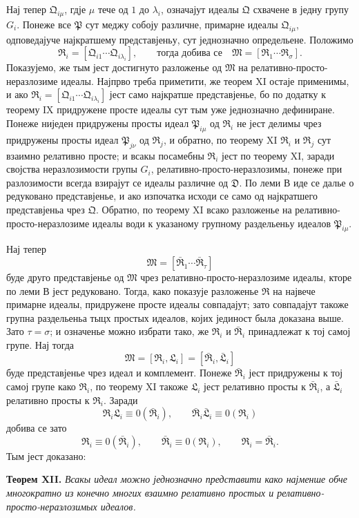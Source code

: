 ﻿\documentclass[11pt]{article}
\newcommand{\ideal}[1]{\mathfrak{#1}}
\begin{document}
Нај тепер \(\ideal Q_{i\mu}\), гдје \(\mu\) тече од \(1\) до \(\lambda_i\), означајут идеалы \(\ideal Q\) схвачене в једну групу \(G_i\). Понеже все \(\ideal P\) сут меджу собоју различне, примарне идеалы \(\ideal Q_{i\mu}\), одповедајуче најкратшему представјеньу, сут једнозначно определьене. Положимо
\[
 \ideal R_i=[\ideal Q_{i1}\cdots\ideal Q_{i\lambda_i}],\qquad
 \text{тогда добива се}\quad
 \ideal M=[\ideal R_1\cdots\ideal R_\sigma].
\]
Показујемо, же тым јест достигнуто разложенье од \(\ideal M\) на релативно-просто-неразлозиме идеалы. Најпрво треба приметити, же теорем XI остаје применимы, и ако \(\ideal R_i=[\ideal Q_{i1}\cdots\ideal Q_{i\lambda_i}]\) јест само најкратше представјенье, бо по додатку к теорему IX придружене просте идеалы сут тым уже једнозначно дефиниране. Понеже ниједен придружены просты идеал \(\ideal P_{i\mu}\) од \(\ideal R_i\) не јест делимы чрез придружены просты идеал \(\ideal P_{j\nu}\) од \(\ideal R_j\), и обратно, по теорему XI \(\ideal R_i\) и \(\ideal R_j\) сут взаимно релативно просте; и всакы посамебны \(\ideal R_i\) јест по теорему XI, заради својства неразлозимости групы \(G_i\), релативно-просто-неразлозимы, понеже при разлозимости всегда взирајут се идеалы различне од \(\ideal D\). По леми В иде се далье о редуковано представјенье, и ако изпочатка исходи се само од најкратшего представјеньа чрез \(\ideal Q\). Обратно, по теорему XI всако разложенье на релативно-просто-неразлозиме идеалы води к указаному групному раздельеньу идеалов \(\ideal P_{i\mu}\).

Нај тепер
\[
 \ideal M=[\bar{\ideal R}_1\cdots\bar{\ideal R}_\tau]
\]
буде друго представјенье од \(\ideal M\) чрез релативно-просто-неразлозиме идеалы, кторе по леми В јест редуковано. Тогда, како показује разложенье \(\ideal R\) на највече примарне идеалы, придружене просте идеалы совпадајут; зато совпадајут такоже групна раздельеньа тыцх простых идеалов, којих јединост была доказана выше. Зато \(\tau=\sigma\); и означенье можно избрати тако, же \(\ideal R_i\) и \(\bar{\ideal R}_i\) принадлежат к тој самој групе. Нај тогда
\[
 \ideal M=[\ideal R_i,\ideal L_i]=[\bar{\ideal R}_i,\bar{\ideal L}_i]
\]
буде представјенье чрез идеал и комплемент. Понеже \(\bar{\ideal R}_i\) јест придружены к тој самој групе како \(\ideal R_i\), по теорему XI такоже \(\ideal L_i\) јест релативно просты к \(\bar{\ideal R}_i\), а \(\bar{\ideal L}_i\) релативно просты к \(\ideal R_i\). Заради
\[
 \ideal R_i\ideal L_i\equiv0(\bar{\ideal R}_i),
 \qquad
 \bar{\ideal R}_i\bar{\ideal L}_i\equiv0(\ideal R_i)
\]
добива се зато
\[
 \ideal R_i\equiv0(\bar{\ideal R}_i),
 \qquad
 \bar{\ideal R}_i\equiv0(\ideal R_i),
 \qquad
 \ideal R_i=\bar{\ideal R}_i.
\]
Тым јест доказано:

\textbf{Теорем XII.} \emph{Всакы идеал можно једнозначно представити како најменше обче многократно из конечно многих взаимно релативно простых и релативно-просто-неразлозимых идеалов.}
\end{document}
